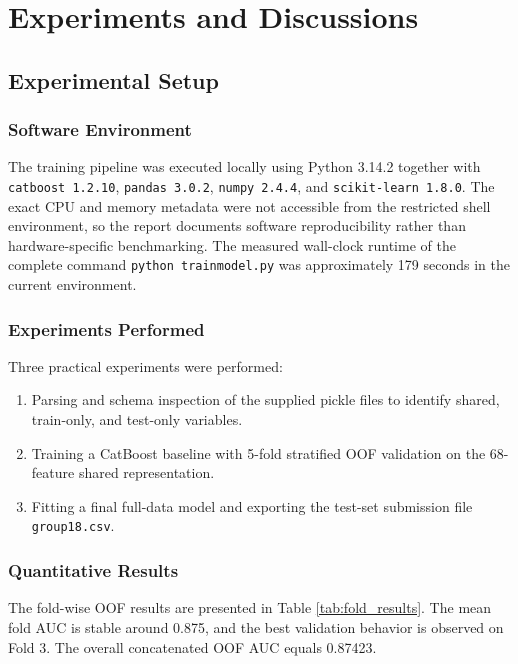 \documentclass[a4paper,12pt]{extreport}
\begin{document}
\chapter{Experiments and Discussions}

\section{Experimental Setup}

\subsection{Software Environment}
The training pipeline was executed locally using Python 3.14.2 together with \texttt{catboost 1.2.10}, \texttt{pandas 3.0.2}, \texttt{numpy 2.4.4}, and \texttt{scikit-learn 1.8.0}. The exact CPU and memory metadata were not accessible from the restricted shell environment, so the report documents software reproducibility rather than hardware-specific benchmarking. The measured wall-clock runtime of the complete command \texttt{python trainmodel.py} was approximately 179 seconds in the current environment.

\subsection{Experiments Performed}
Three practical experiments were performed:
\begin{enumerate}[leftmargin=1.7em]
    \item Parsing and schema inspection of the supplied pickle files to identify shared, train-only, and test-only variables.
    \item Training a CatBoost baseline with 5-fold stratified OOF validation on the 68-feature shared representation.
    \item Fitting a final full-data model and exporting the test-set submission file \texttt{group18.csv}.
\end{enumerate}

\subsection{Quantitative Results}
The fold-wise OOF results are presented in Table \ref{tab:fold_results}. The mean fold AUC is stable around 0.875, and the best validation behavior is observed on Fold 3. The overall concatenated OOF AUC equals 0.87423.
\end{document}
